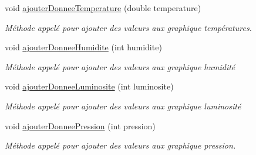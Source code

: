 \begin{DoxyCompactItemize}
void \hyperlink{class_graphique_a42b3c986ca86c426adbb8fdb03a04380}{ajouter\+Donnee\+Temperature} (double temperature)
\begin{DoxyCompactList}\small\item\em Méthode appelé pour ajouter des valeurs aux graphique températures. \end{DoxyCompactList}\item 
void \hyperlink{class_graphique_ad3dd36f05a9923054a0a2138f96f0311}{ajouter\+Donnee\+Humidite} (int humidite)
\begin{DoxyCompactList}\small\item\em Méthode appelé pour ajouter des valeurs aux graphique humidité \end{DoxyCompactList}\item 
void \hyperlink{class_graphique_a1af0e1968998cb7b5ee8add1197cb0e0}{ajouter\+Donnee\+Luminosite} (int luminosite)
\begin{DoxyCompactList}\small\item\em Méthode appelé pour ajouter des valeurs aux graphique luminosité \end{DoxyCompactList}\item 
void \hyperlink{class_graphique_a289f0631e56465012511fd7ec9da1b23}{ajouter\+Donnee\+Pression} (int pression)
\begin{DoxyCompactList}\small\item\em Méthode appelé pour ajouter des valeurs aux graphique pression. \end{DoxyCompactList}\end{DoxyCompactItemize}
